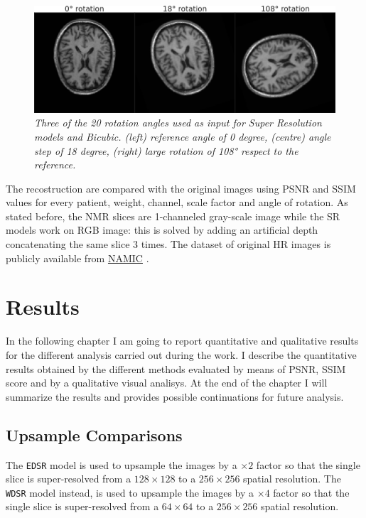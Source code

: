 \documentclass[12pt,a4paper]{report}
\begin{document}
\begin{figure}[H]
 \centering
 \includegraphics[scale=0.3]{images/rotations.png}
 \caption{\it Three of the 20 rotation angles used as input for Super Resolution models and Bicubic. (left) reference angle of 0 degree, (centre) angle step of 18 degree, (right) large rotation of 108° respect to the reference. }
 \label{fig:rotations}
\end{figure}

The recostruction are compared with the original images using PSNR and SSIM values for every patient, weight, channel, scale factor and angle of rotation. 
As stated before, the NMR slices are 1-channeled gray-scale image while the SR models work on RGB image: this is solved by adding an artificial depth concatenating the same slice 3 times. 
The dataset of original HR images is publicly available from \href{http://insight-journal.org/midas/collection/view/190}{NAMIC} \cite{dataset}. 

\chapter{Results}

In the following chapter I am going to report quantitative and qualitative results for the different analysis carried out during the work.
I describe the quantitative results obtained by the different methods evaluated by means of PSNR, SSIM score and by a qualitative visual analisys.
At the end of the chapter I will summarize the results and provides possible continuations for future analysis.  

\section{Upsample Comparisons}

The {\tt EDSR} model is used to upsample the images by a $\times 2$ factor so that the single slice is super-resolved from a $128 \times 128$ to a $256 \times 256$ spatial resolution. 
The {\tt WDSR} model instead, is used to upsample the images by a $\times 4$ factor so that the single slice is super-resolved from a $64 \times 64$ to a $256 \times 256$ spatial resolution. 
\end{document}
